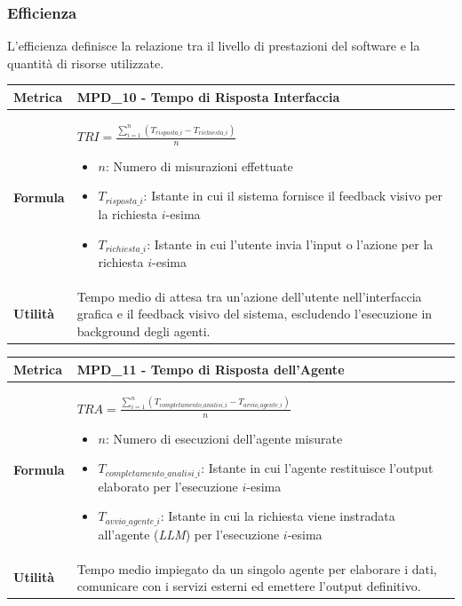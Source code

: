 \documentclass[12pt, a4paper]{article}
\begin{document}
\subsubsection{Efficienza}
L'efficienza definisce la relazione tra il livello di prestazioni del software e la quantità di risorse utilizzate.

\begin{table}[H]
\centering
\renewcommand{\arraystretch}{1.5}
\begin{tabular}{|l|p{12cm}|}
\hline
\textbf{Metrica} & MPD\_10 - Tempo di Risposta Interfaccia \\ \hline
\textbf{Formula} & $TRI = \frac{\sum_{i=1}^{n} (T_{risposta\_i} - T_{richiesta\_i})}{n}$
\begin{itemize}
    \item $n$: Numero di misurazioni effettuate
    \item $T_{risposta\_i}$: Istante in cui il sistema fornisce il feedback visivo per la richiesta $i$-esima
    \item $T_{richiesta\_i}$: Istante in cui l'utente invia l'input o l'azione per la richiesta $i$-esima
\end{itemize} \\ \hline
\textbf{Utilità} & Tempo medio di attesa tra un'azione dell'utente nell'interfaccia grafica e il feedback visivo del sistema, escludendo l'esecuzione in background degli agenti. \\ \hline
\end{tabular}
\end{table}

\begin{table}[H]
\centering
\renewcommand{\arraystretch}{1.5}
\begin{tabular}{|l|p{12cm}|}
\hline
\textbf{Metrica} & MPD\_11 - Tempo di Risposta dell'Agente \\ \hline
\textbf{Formula} & $TRA = \frac{\sum_{i=1}^{n} (T_{completamento\_analisi\_i} - T_{avvio\_agente\_i})}{n}$
\begin{itemize}
    \item $n$: Numero di esecuzioni dell'agente misurate
    \item $T_{completamento\_analisi\_i}$: Istante in cui l'agente restituisce l'output elaborato per l'esecuzione $i$-esima
    \item $T_{avvio\_agente\_i}$: Istante in cui la richiesta viene instradata all'agente (\textit{LLM}) per l'esecuzione $i$-esima
\end{itemize} \\ \hline
\textbf{Utilità} & Tempo medio impiegato da un singolo agente per elaborare i dati, comunicare con i servizi esterni ed emettere l'output definitivo. \\ \hline
\end{tabular}
\end{table}
\end{document}

